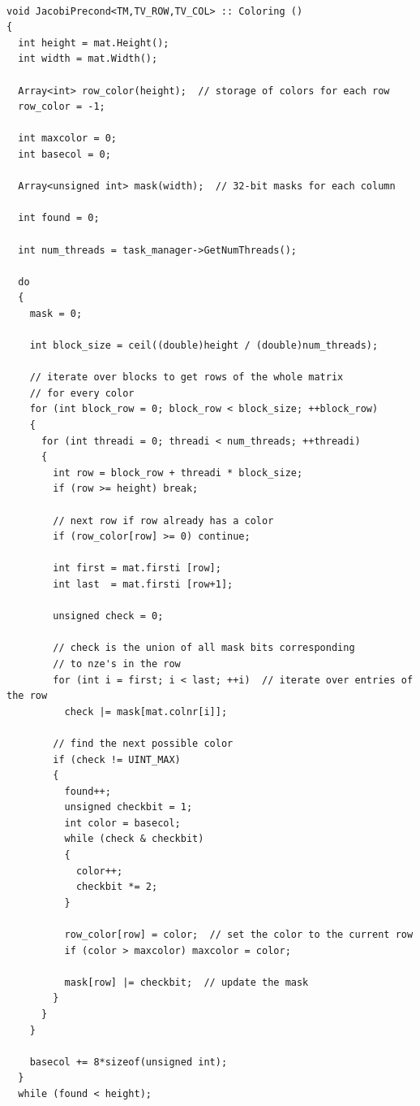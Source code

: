 \documentclass[a4paper,11pt]{scrartcl}
\begin{document}
\begin{lstlisting}

void JacobiPrecond<TM,TV_ROW,TV_COL> :: Coloring ()
{
  int height = mat.Height();
  int width = mat.Width();

  Array<int> row_color(height);  // storage of colors for each row
  row_color = -1;

  int maxcolor = 0;
  int basecol = 0;

  Array<unsigned int> mask(width);  // 32-bit masks for each column

  int found = 0;

  int num_threads = task_manager->GetNumThreads();

  do
  {
    mask = 0;

    int block_size = ceil((double)height / (double)num_threads);

    // iterate over blocks to get rows of the whole matrix
    // for every color
    for (int block_row = 0; block_row < block_size; ++block_row)
    {
      for (int threadi = 0; threadi < num_threads; ++threadi)
      {
        int row = block_row + threadi * block_size;
        if (row >= height) break;

        // next row if row already has a color
        if (row_color[row] >= 0) continue;

        int first = mat.firsti [row];
        int last  = mat.firsti [row+1];

        unsigned check = 0;

        // check is the union of all mask bits corresponding
        // to nze's in the row
        for (int i = first; i < last; ++i)  // iterate over entries of the row
          check |= mask[mat.colnr[i]];

        // find the next possible color
        if (check != UINT_MAX)
        {
          found++;
          unsigned checkbit = 1;
          int color = basecol;
          while (check & checkbit)
          {
            color++;
            checkbit *= 2;
          }

          row_color[row] = color;  // set the color to the current row
          if (color > maxcolor) maxcolor = color;

          mask[row] |= checkbit;  // update the mask
        }
      }
    }

    basecol += 8*sizeof(unsigned int);
  }
  while (found < height);


\end{lstlisting}
\end{document}

